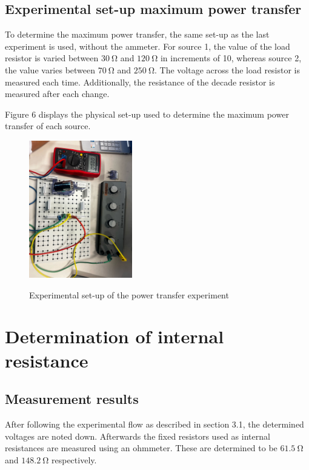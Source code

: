 \documentclass[a4paper]{article}
\newcommand{\unit}[1]{~\mathrm{#1}}
\begin{document}
\subsection{Experimental set-up maximum power transfer}
To determine the maximum power transfer, the same set-up as the last experiment
is used, without the ammeter. For source 1, the value of the load resistor is
varied between $30\unit{\Omega}$ and $120\unit{\Omega}$ in increments of 10,
whereas source 2, the value varies between $70\unit{\Omega}$ and
$250\unit{\Omega}$. The voltage across the load resistor is measured each time.
Additionally, the resistance of the decade resistor is measured after each
change.

Figure 6 displays the physical set-up used to determine the maximum power
transfer of each source.

\begin{figure}[!ht]
    \centering
    \includegraphics[width = 0.4\textwidth, angle = 90]{powertransf.jpeg}
    \label{fig:6}
    \caption{Experimental set-up of the power transfer experiment}    
\end{figure}

\newpage
\section{Determination of internal resistance}
\subsection{Measurement results}
After following the experimental flow as described in section 3.1, the determined
voltages are noted down. Afterwards the fixed resistors used as internal
resistances are measured using an ohmmeter. These are determined to be
$61.5\unit{\Omega}$ and $148.2\unit{\Omega}$ respectively. 
\end{document}
